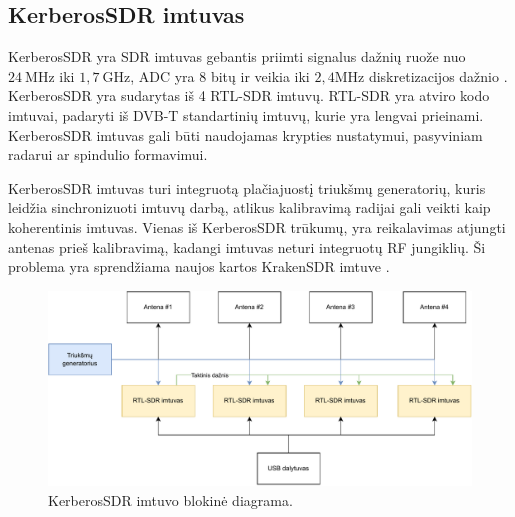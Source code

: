 \documentclass[main.tex]{subfiles}
\begin{document}
\subsection{KerberosSDR imtuvas}\label{sec:kerberossdr}

KerberosSDR yra SDR imtuvas gebantis priimti signalus dažnių ruože nuo $24\ \mathrm{MHz}$
iki $1,7\ \mathrm{GHz}$, ADC yra 8 bitų ir veikia iki $2,4 \mathrm{MHz}$ diskretizacijos dažnio
\cite{kerberossdr}.
KerberosSDR yra sudarytas iš 4 RTL-SDR imtuvų. RTL-SDR yra atviro kodo imtuvai, padaryti iš
DVB-T standartinių imtuvų, kurie yra lengvai prieinami. KerberosSDR imtuvas
gali būti naudojamas krypties nustatymui, pasyviniam radarui ar spindulio formavimui.

KerberosSDR imtuvas turi integruotą plačiajuostį triukšmų generatorių, kuris leidžia
sin\-chro\-ni\-zuo\-ti imtuvų darbą, atlikus kalibravimą radijai gali veikti kaip koherentinis imtuvas.
Vienas iš KerberosSDR trūkumų, yra reikalavimas atjungti antenas prieš kalibravimą, kadangi
imtuvas neturi integruotų RF jungiklių. Ši problema yra sprendžiama naujos kartos KrakenSDR
imtuve \cite{krakensdr}.

\begin{figure}[h]
    \begin{centering}
    \includegraphics[scale=0.8]{drawings/kerberos_sdr_blockdiagram}
    \par\end{centering}
    \protect\caption{\label{fig:kerberos_block}KerberosSDR imtuvo blokinė diagrama.}
\end{figure}
\end{document}
